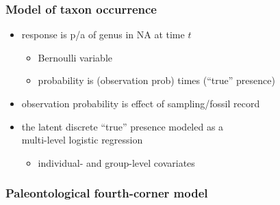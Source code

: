 \documentclass{beamer}
\begin{document}
\begin{frame}
  \frametitle{Model of taxon occurrence}
  \begin{itemize}
    \item response is p/a of genus in NA at time \(t\)
      \begin{itemize}
        \item Bernoulli variable 
        \item probability is (observation prob) times (``true'' presence)
      \end{itemize}
    \item observation probability is effect of sampling/fossil record
    \item the latent discrete ``true'' presence modeled as a \\multi-level logistic regression
      \begin{itemize}
        \item individual- and group-level covariates
      \end{itemize}
  \end{itemize}
\end{frame}

\begin{frame}
  \frametitle{Paleontological fourth-corner model}
  \begin{center}
  \end{center}

\end{frame}
\end{document}
